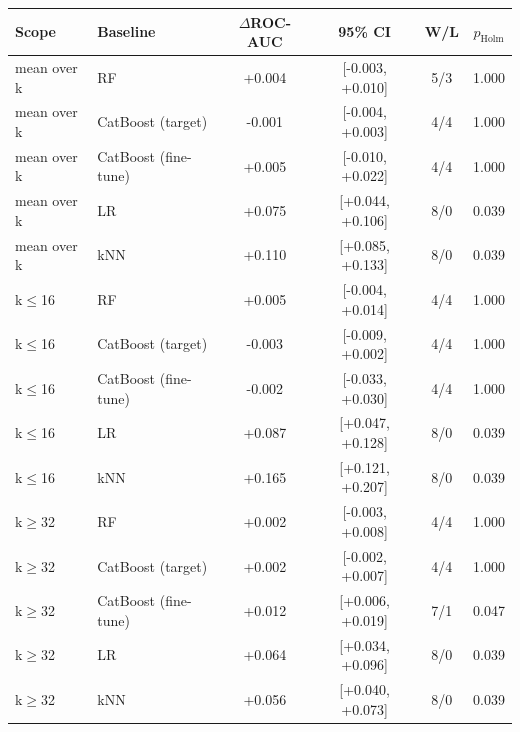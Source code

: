 \begin{tabular}{llcccc}
\toprule
Scope & Baseline & $\Delta$ROC-AUC & 95\% CI & W/L & $p_{\text{Holm}}$ \\
\midrule
mean over k & RF & +0.004 & [-0.003, +0.010] & 5/3 & 1.000 \\
mean over k & CatBoost (target) & -0.001 & [-0.004, +0.003] & 4/4 & 1.000 \\
mean over k & CatBoost (fine-tune) & +0.005 & [-0.010, +0.022] & 4/4 & 1.000 \\
mean over k & LR & +0.075 & [+0.044, +0.106] & 8/0 & 0.039 \\
mean over k & kNN & +0.110 & [+0.085, +0.133] & 8/0 & 0.039 \\
k$\leq$16 & RF & +0.005 & [-0.004, +0.014] & 4/4 & 1.000 \\
k$\leq$16 & CatBoost (target) & -0.003 & [-0.009, +0.002] & 4/4 & 1.000 \\
k$\leq$16 & CatBoost (fine-tune) & -0.002 & [-0.033, +0.030] & 4/4 & 1.000 \\
k$\leq$16 & LR & +0.087 & [+0.047, +0.128] & 8/0 & 0.039 \\
k$\leq$16 & kNN & +0.165 & [+0.121, +0.207] & 8/0 & 0.039 \\
k$\geq$32 & RF & +0.002 & [-0.003, +0.008] & 4/4 & 1.000 \\
k$\geq$32 & CatBoost (target) & +0.002 & [-0.002, +0.007] & 4/4 & 1.000 \\
k$\geq$32 & CatBoost (fine-tune) & +0.012 & [+0.006, +0.019] & 7/1 & 0.047 \\
k$\geq$32 & LR & +0.064 & [+0.034, +0.096] & 8/0 & 0.039 \\
k$\geq$32 & kNN & +0.056 & [+0.040, +0.073] & 8/0 & 0.039 \\
\bottomrule
\end{tabular}
